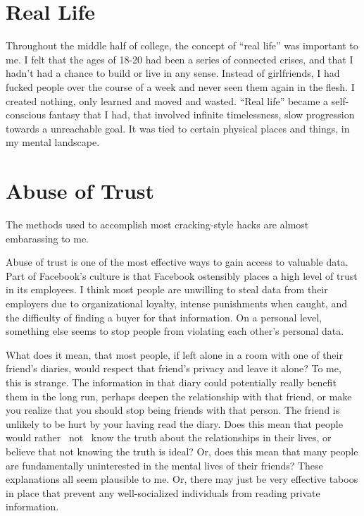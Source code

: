 \documentclass[12pt]{article}
\begin{document}
\section{Real Life}
Throughout the middle half of college, the concept of ``real life'' was
important to me.  I felt that the ages of 18-20 had been a series of connected
crises, and that I hadn't had a chance to build or live in any sense.  Instead
of girlfriends, I had fucked people over the course of a week and never seen
them again in the flesh.  I created nothing, only learned and moved and wasted.
``Real life'' became a self-conscious fantasy that I had, that involved infinite
timelessness, slow progression towards a unreachable goal.  It was tied to
certain physical places and things, in my mental landscape.

\section{Abuse of Trust}
The methods used to accomplish most cracking-style hacks are almost
embarassing to me. 

Abuse of trust is one of the most effective ways to gain access to valuable
data.  Part of Facebook's culture is that Facebook ostensibly places a high
level of trust in its employees.  I think most people are unwilling to steal
data from their employers due to organizational loyalty, intense punishments
when caught, and the difficulty of finding a buyer for that information.  On a
personal level, something else seems to stop people from violating each other's
personal data.

What does it mean, that most people, if left alone in a room with one of their
friend's diaries, would respect that friend's privacy and leave it alone?  To
me, this is strange.  The information in that diary could potentially really
benefit them in the long run, perhaps deepen the relationship with that friend,
or make you realize that you should stop being friends with that person.  The
friend is unlikely to be hurt by your having read the diary.  Does this mean
that people would rather ~not~ know the truth about the relationships in their
lives, or believe that not knowing the truth is ideal?  Or, does this mean that
many people are fundamentally uninterested in the mental lives of their friends?
These explanations all seem plausible to me.  Or, there may just be very
effective taboos in place that prevent any well-socialized individuals from
reading private information.
\end{document}
